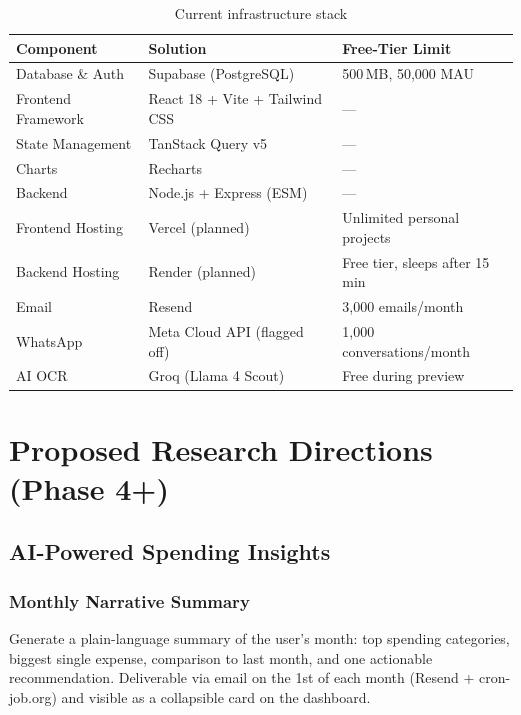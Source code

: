 \documentclass[11pt,a4paper]{article}
\begin{document}
\begin{table}[h]
\centering
\renewcommand{\arraystretch}{1.35}
\begin{tabular}{p{3cm} p{4.5cm} p{5.5cm}}
\toprule
\textbf{Component} & \textbf{Solution} & \textbf{Free-Tier Limit} \\
\midrule
Database \& Auth     & Supabase (PostgreSQL)              & 500\,MB, 50,000 MAU \\
Frontend Framework   & React 18 + Vite + Tailwind CSS     & — \\
State Management     & TanStack Query v5                  & — \\
Charts               & Recharts                           & — \\
Backend              & Node.js + Express (ESM)            & — \\
Frontend Hosting     & Vercel (planned)                   & Unlimited personal projects \\
Backend Hosting      & Render (planned)                   & Free tier, sleeps after 15\,min \\
Email                & Resend                             & 3,000 emails/month \\
WhatsApp             & Meta Cloud API (flagged off)       & 1,000 conversations/month \\
AI OCR               & Groq (Llama 4 Scout)               & Free during preview \\
\bottomrule
\end{tabular}
\caption{Current infrastructure stack}
\end{table}

\section{Proposed Research Directions (Phase 4+)}

\subsection{AI-Powered Spending Insights}

\subsubsection*{Monthly Narrative Summary}
Generate a plain-language summary of the user's month: top spending categories,
biggest single expense, comparison to last month, and one actionable
recommendation. Deliverable via email on the 1st of each month (Resend +
cron-job.org) and visible as a collapsible card on the dashboard.
\end{document}
